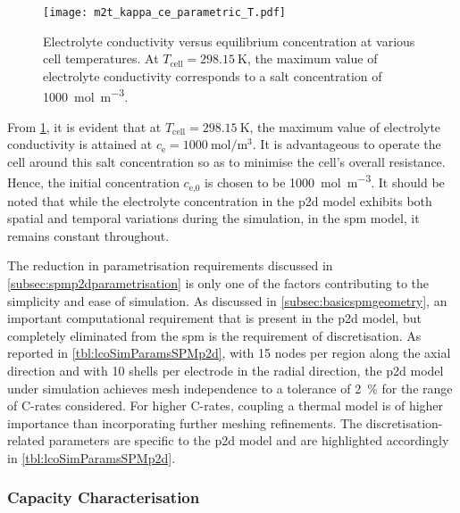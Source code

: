 \begin{figure}[!htbp]
    \centering
    \texttt{[image: m2t\_kappa\_ce\_parametric\_T.pdf]}
    \caption[Electrolyte conductivity versus concentration at various cell
    temperatures]{Electrolyte conductivity versus equilibrium concentration at
        various cell temperatures. At ${T_\text{cell} = \SI{298.15}{\kelvin}}$,
        the maximum value of electrolyte conductivity corresponds to a salt
    concentration of \SI{1000}{\mol\per\meter\cubed}.}
    \label{fig:kappavsce}
\end{figure}

From \cref{fig:kappavsce},       it        is       evident        that       at
$T_\text{cell}=\SI{298.15}{\kelvin}$,   the   maximum   value   of   electrolyte
conductivity is attained at  $c_\text{e} = \SI{1000}{\mole\per\meter\cubed}$. It
is advantageous  to operate  the cell  around this salt  concentration so  as to
minimise  the  cell's  overall  resistance.  Hence,  the  initial  concentration
$c_\text{e,0}$ is  chosen to  be \SI{1000}{\mole\per\meter\cubed}. It  should be
noted that while  the electrolyte concentration in the  \gls{p2d} model exhibits
both spatial  and temporal  variations during the  simulation, in  the \gls{spm}
model, it remains constant throughout.

The     reduction    in     parametrisation     requirements    discussed     in
\cref{subsec:spmp2dparametrisation}    is    only    one    of    the    factors
contributing  to  the  simplicity  and  ease  of  simulation.  As  discussed  in
\cref{subsec:basicspmgeometry}, an  important computational requirement  that is
present in the \gls{p2d} model, but  completely eliminated from the \gls{spm} is
the requirement of discretisation. As reported in \cref{tbl:lcoSimParamsSPMp2d},
with  15 nodes  per region  along the  axial direction  and with  10 shells  per
electrode in the radial direction, the \gls{p2d} model under simulation achieves
mesh  independence  to a  tolerance  of  \approx\SI{2}{\percent} for  the  range
of  C-rates  considered.  For  higher  C-rates,  coupling  a  thermal  model  is
of  higher  importance  than  incorporating  further  meshing  refinements.  The
discretisation-related parameters  are specific to  the \gls{p2d} model  and are
highlighted accordingly in \cref{tbl:lcoSimParamsSPMp2d}.

\subsubsection*{Capacity Characterisation}\label{subsubsec:capcharspmp2d}

